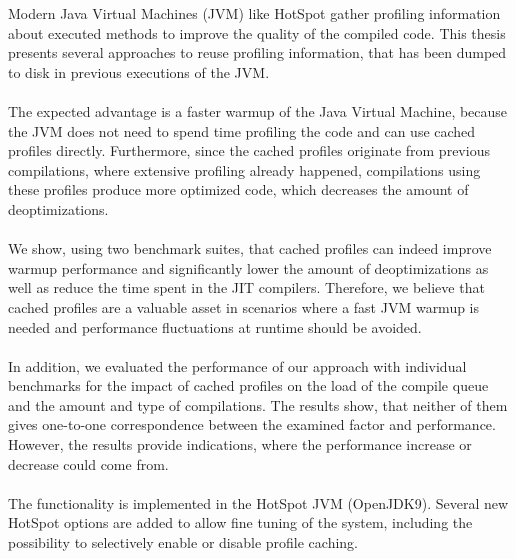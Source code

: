 Modern Java Virtual Machines (JVM) like HotSpot gather profiling information about executed methods to improve the quality of the compiled code.
This thesis presents several approaches to reuse profiling information, that has been dumped to disk in previous executions of the JVM.
\\\\
The expected advantage is a faster warmup of the Java Virtual Machine, because the JVM does not need to spend time profiling the code and can use cached profiles directly.
Furthermore, since the cached profiles originate from previous compilations, where extensive profiling already happened, compilations using these profiles produce more optimized code, which decreases the amount of deoptimizations.
\\\\
We show, using two benchmark suites, that cached profiles can indeed improve warmup performance and significantly lower the amount of deoptimizations as well as reduce the time spent in the JIT compilers.
Therefore, we believe that cached profiles are a valuable asset in scenarios where a fast JVM warmup is needed and performance fluctuations at runtime should be avoided.
\\\\
In addition, we evaluated the performance of our approach with individual benchmarks for the impact of cached profiles on the load of the compile queue and the amount and type of compilations. The results show, that neither of them gives one-to-one correspondence between the examined factor and performance. However, the results provide indications, where the performance increase or decrease could come from.
\\\\
The functionality is implemented in the HotSpot JVM (OpenJDK9). Several new HotSpot options are added to allow fine tuning of the system, including the possibility to selectively enable or disable profile caching.
